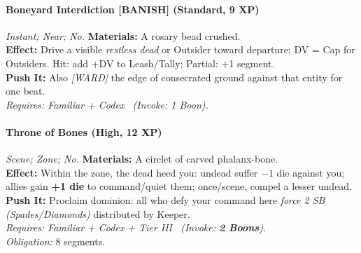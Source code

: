 \paragraph{Boneyard Interdiction \textnormal{[BANISH]} (Standard, 9 XP)} \emph{Instant; Near; No.}
\textbf{Materials:} A rosary bead crushed.\\
\textbf{Effect:} Drive a visible \emph{restless dead} or Outsider toward departure; DV = Cap for Outsiders. Hit: add +DV to Leash/Tally; Partial: +1 segment.\\
\textbf{Push It:} Also \emph{[WARD]} the edge of consecrated ground against that entity for one beat.\\
\emph{Requires: Familiar + Codex \ (\textit{Invoke:} 1 Boon).}

\paragraph{Throne of Bones (High, 12 XP)} \emph{Scene; Zone; No.}
\textbf{Materials:} A circlet of carved phalanx-bone.\\
\textbf{Effect:} Within the zone, the dead heed you: undead suffer \(-1\) die against you; allies gain \textbf{+1 die} to command/quiet them; once/scene, compel a lesser undead.\\
\textbf{Push It:} Proclaim dominion: all who defy your command here \emph{force 2 SB (Spades/Diamonds)} distributed by Keeper.\\
\emph{Requires: Familiar + Codex + Tier III \ (\textit{Invoke:} \textbf{2 Boons}).}\\
\emph{Obligation:} 8 segments.
